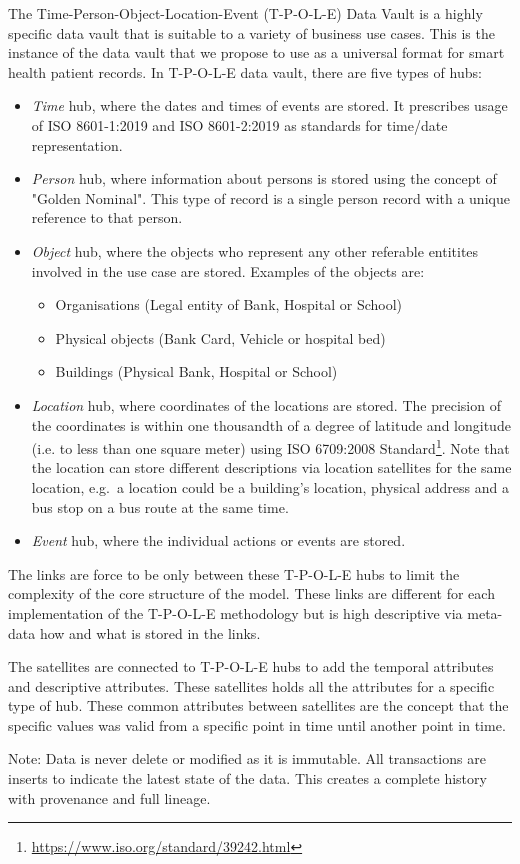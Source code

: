 The Time-Person-Object-Location-Event (T-P-O-L-E) Data Vault is a highly specific data vault that is suitable to a variety of business use cases. This is the instance of the data vault that we propose to use as a universal format for smart health patient records. In T-P-O-L-E data vault, there are five types of hubs:
\begin{itemize}
    \item \emph{Time} hub, where the dates and times of events are stored. It prescribes usage of ISO 8601-1:2019 and ISO 8601-2:2019 as standards for time/date representation.
    
    \item \emph{Person} hub, where information about persons is stored using the concept of "Golden Nominal". This type of record is a single person record with a unique reference to that person.
    
    \item \emph{Object} hub, where the objects who represent any other referable entitites involved in the use case are stored. Examples of the objects are:
    \begin{itemize}
        \item Organisations (Legal entity of Bank, Hospital or School)
        \item Physical objects (Bank Card, Vehicle or hospital bed)
        \item Buildings (Physical Bank, Hospital or School)
    \end{itemize}
    \item \emph{Location} hub, where coordinates of the locations are stored. The precision of the coordinates is within one thousandth of a degree of latitude and longitude (i.e. to less than one square meter) using ISO 6709:2008 Standard\footnote{\url{https://www.iso.org/standard/39242.html}}. Note that the location can store different descriptions via location satellites for the same location, e.g.~a location could be a building's location, physical address and a bus stop on a bus route at the same time.
    
    \item \emph{Event} hub, where the individual actions or events are stored.
\end{itemize}

The links are force to be only between these T-P-O-L-E hubs to limit the complexity of the core structure of the model. These links are different for each implementation of the T-P-O-L-E methodology but is high descriptive via meta-data how and what is stored in the links.

The satellites are connected to T-P-O-L-E hubs to add the temporal attributes and descriptive attributes.
These satellites holds all the attributes for a specific type of hub.
These common attributes between satellites are the concept that the specific values was valid from a specific point in time until another point in time.

Note: Data is never delete or modified as it is immutable. All transactions are inserts to indicate the latest state of the data. This creates a complete history with provenance and full lineage.

